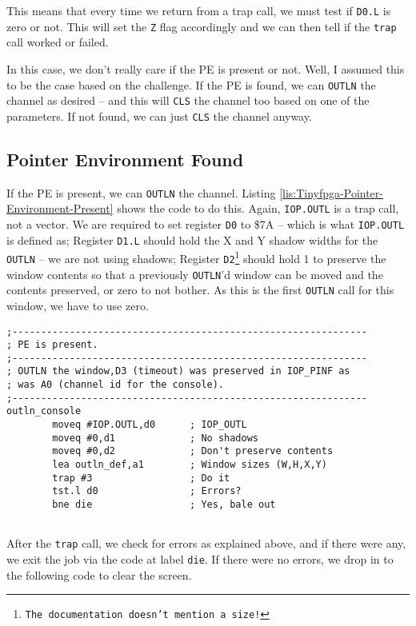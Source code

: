 This means that every time we return from a trap call, we must test
if \texttt{D0.L} is zero or not. This will set the \texttt{Z} flag
accordingly and we can then tell if the \texttt{trap} call worked
or failed.

In this case, we don't really care if the PE is present or not. Well,
I assumed this to be the case based on the challenge. If the PE is
found, we can \texttt{OUTLN} the channel as desired -- and this will
\texttt{CLS} the channel too based on one of the parameters. If not
found, we can just \texttt{CLS} the channel anyway.

\subsection{Pointer Environment Found}

If the PE is present, we can \texttt{OUTLN} the channel. Listing \ref{lis:Tinyfpga-Pointer-Environment-Present}
shows the code to do this. Again, \texttt{IOP.OUTL} is a trap call,
not a vector. We are required to set register \texttt{D0} to \$7A
-- which is what \texttt{IOP.OUTL} is defined as; Register \texttt{D1.L}
should hold the X and Y shadow widths for the \texttt{OUTLN} -- we
are not using shadows; Register \texttt{D2}\footnote{\texttt{The documentation doesn't mention a size!}}
should hold 1 to preserve the window contents so that a previously
\texttt{OUTLN}'d window can be moved and the contents preserved, or
zero to not bother. As this is the first \texttt{OUTLN} call for this
window, we have to use zero.

\begin{lstlisting}[caption={Tinyfpga - Pointer Environment Present},label={lis:Tinyfpga-Pointer-Environment-Present}]
;--------------------------------------------------------------
; PE is present.
;--------------------------------------------------------------
; OUTLN the window,D3 (timeout) was preserved in IOP_PINF as 
; was A0 (channel id for the console).
;--------------------------------------------------------------
outln_console
        moveq #IOP.OUTL,d0      ; IOP_OUTL
        moveq #0,d1             ; No shadows
        moveq #0,d2             ; Don't preserve contents
        lea outln_def,a1        ; Window sizes (W,H,X,Y)
        trap #3                 ; Do it
        tst.l d0                ; Errors?
        bne die                 ; Yes, bale out
        
\end{lstlisting}

After the \texttt{trap} call, we check for errors as explained above,
and if there were any, we exit the job via the code at label \texttt{die}.
If there were no errors, we drop in to the following code to clear
the screen. 

